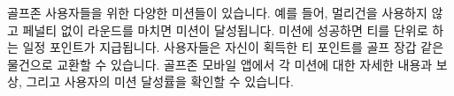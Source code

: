 \documentclass[10pt, openright, language=korean]{hzguide}
\begin{document}
골프존 사용자들을 위한 다양한 미션들이 있습니다.
예를 들어, 멀리건을 사용하지 않고 페널티 없이 라운드를 마치면  미션이 달성됩니다.
미션에 성공하면 티를 단위로 하는 일정 포인트가 지급됩니다.
사용자들은 자신이 획득한 티 포인트를 골프 장갑 같은 물건으로 교환할 수 있습니다.
골프존 모바일 앱에서 각 미션에 대한 자세한 내용과 보상, 그리고 사용자의 미션 달성률을 확인할 수 있습니다.












\end{document}
